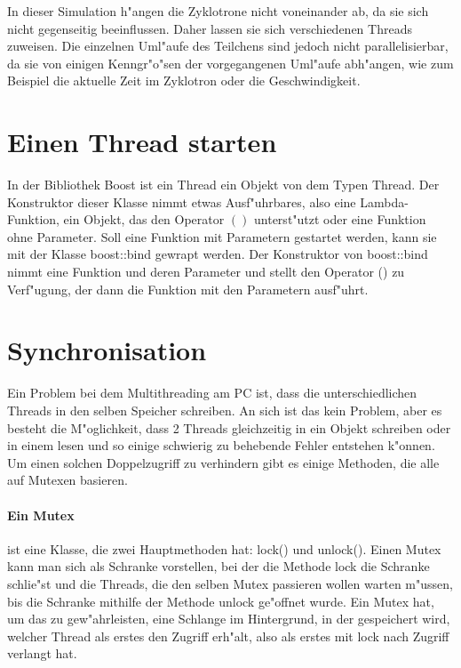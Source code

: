 \documentclass[14pt, a4paper]{report}
\begin{document}
In dieser Simulation h"angen die Zyklotrone nicht voneinander ab, da sie sich nicht
gegenseitig beeinflussen. Daher lassen sie sich verschiedenen Threads zuweisen. Die
einzelnen Uml"aufe des Teilchens sind jedoch nicht parallelisierbar, da sie von einigen
Kenngr"o"sen der vorgegangenen Uml"aufe abh"angen, wie zum Beispiel die aktuelle Zeit 
im Zyklotron oder die Geschwindigkeit.

\section{Einen Thread starten}
In der Bibliothek Boost ist ein Thread ein Objekt von dem Typen Thread. Der
Konstruktor dieser Klasse nimmt etwas Ausf"uhrbares, also eine Lambda-Funktion,
ein Objekt, das den Operator $()$ unterst"utzt oder eine Funktion ohne Parameter.
Soll eine Funktion mit Parametern gestartet werden, kann sie mit der Klasse
boost::bind gewrapt werden. Der Konstruktor von boost::bind nimmt eine Funktion und deren
Parameter und stellt den Operator () zu Verf"ugung, der dann die Funktion mit den 
Parametern ausf"uhrt.

\section{Synchronisation} \label{Synchronisation}
Ein Problem bei dem Multithreading am PC ist, dass die unterschiedlichen Threads in den
selben Speicher schreiben. An sich ist das kein Problem, 
aber es besteht die M"oglichkeit,
dass 2 Threads gleichzeitig in ein Objekt schreiben oder in einem lesen und so einige
schwierig zu behebende Fehler entstehen k"onnen. Um einen solchen Doppelzugriff zu 
verhindern gibt es einige Methoden, die alle auf Mutexen basieren.

\paragraph{Ein Mutex} ist eine Klasse, die zwei Hauptmethoden hat: lock() und unlock(). Einen
Mutex kann man sich als Schranke vorstellen, bei der die Methode lock die Schranke schlie"st
und die Threads, die den selben Mutex passieren wollen warten m"ussen, bis die Schranke
mithilfe der Methode unlock ge"offnet wurde. Ein Mutex hat, um das zu gew"ahrleisten,
eine
Schlange im Hintergrund, in der gespeichert wird, welcher Thread als erstes den Zugriff
erh"alt, also als erstes mit lock nach Zugriff verlangt hat. 
\end{document}
